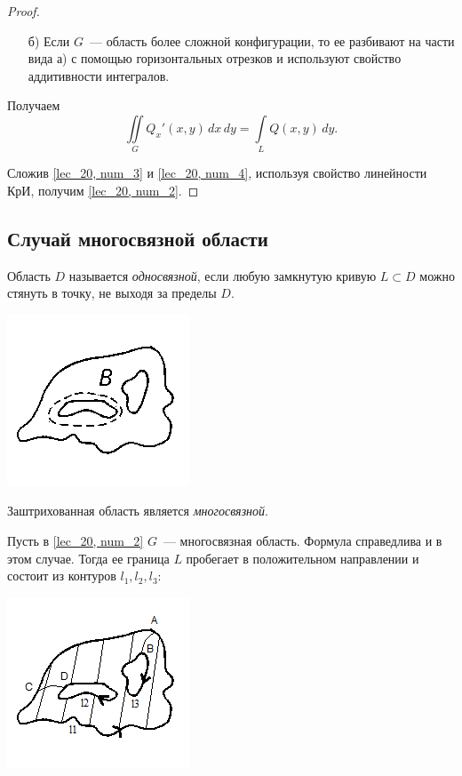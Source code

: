\documentclass[../../main.tex]{subfiles}
\begin{document}
\begin{proof}
\begin{itemize}
		\item[б)] Если $G$~--- область более сложной конфигурации, то ее
		разбивают на части вида а) с помощью горизонтальных отрезков и
		используют свойство аддитивности интегралов.
	\end{itemize}

Получаем
\begin{equation}
\label{lec_20, num_4}
\iint\limits_{G} Q_x' (x, y)\, dx\, dy =
\int\limits_{L} Q (x, y)\, dy.
\end{equation}

Сложив \eqref{lec_20, num_3} и \eqref{lec_20, num_4}, используя свойство 
линейности КрИ, получим 
\eqref{lec_20, num_2}.
\end{proof}

\subsection{Случай многосвязной области}

\begin{defn}
	Область $D$ называется \emph{односвязной}, если любую замкнутую кривую $L 
	\subset D$ 
	можно стянуть в точку, не выходя за пределы $D$.
\end{defn}

\begin{center}
	\includegraphics[scale = 1.5]{lec20_6.png}
\end{center}

Заштрихованная область является \emph{многосвязной}.

Пусть в \eqref{lec_20, num_2} $G$~--- многосвязная область. Формула 
справедлива
и в этом случае. Тогда ее граница $L$ пробегает в 
положительном направлении и
состоит из контуров $l_1, l_2, l_3$:
\begin{center}
	\includegraphics[scale = 1.5]{lec20_7.png}
\end{center}
\end{document}
